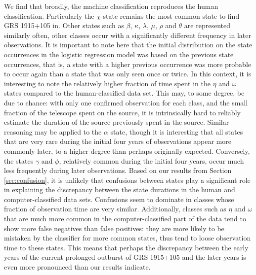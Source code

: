 \documentclass[12pt]{emulateapj}
\begin{document}
We find that broadly, the machine classification reproduces the human classification. Particularly the $\chi$ state remains the most common state to find GRS 1915+105 in. Other states such as $\beta$, $\kappa$, $\lambda$, $\mu$, $\rho$ and $\theta$ are represented similarly often, other classes occur with a significantly different frequency in later observations. It is important to note here that the initial distribution on the state occurrences in the logistic regression model was based on the previous state occurrences, that is, a state with a higher previous occurrence was more probable to occur again than a state that was only seen once or twice. In this context, it is interesting to note the relatively higher fraction of time spent in the $\eta$ and $\omega$ states compared to the human-classified data set.
This may, to some degree, be due to chance: with only one confirmed observation for each class, and the small fraction of the telescope spent on the source, it is intrinsically hard to reliably estimate the duration of the source previously spent in the source. Similar reasoning may be applied to the $\alpha$ state, though it is interesting that all states that are very rare during the initial four years of observations appear more commonly later, to a higher degree than perhaps originally expected. Conversely, the states $\gamma$ and $\phi$, relatively common during the initial four years, occur much less frequently during later observations.
Based on our results from Section \ref{sec:confusion}, it is unlikely that confusions between states play a significant role in explaining the discrepancy between the state durations in the human and computer-classified data sets. Confusions seem to dominate in classes whose fraction of observation time are very similar.
Additionally, classes such as $\eta$ and $\omega$ that are much more common in the computer-classified part of the data tend to show more false negatives than false positives: they are more likely to be mistaken by the classifier for more common states, thus tend to loose observation time to these states. This means that perhaps the discrepancy between the early years of the current prolonged outburst of GRS 1915+105 and the later years is even more pronounced than our results indicate.
\end{document}
